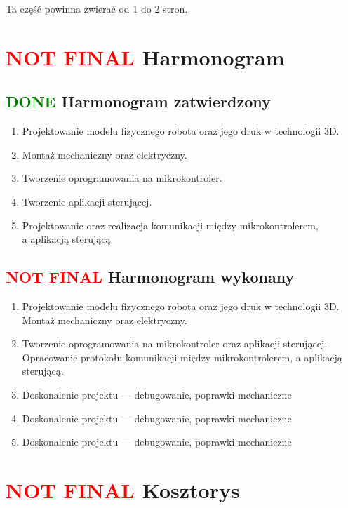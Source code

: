 \documentclass[11pt,titlepage]{article}
\begin{document}
Ta część powinna zwierać od 1 do 2 stron.

\newpage

\section{\textcolor{red}{NOT FINAL} Harmonogram}

\subsection{\textcolor{green}{DONE} Harmonogram zatwierdzony}

\begin{enumerate}
    \item Projektowanie modelu fizycznego robota oraz jego druk w technologii 3D.
    \item Montaż mechaniczny oraz elektryczny.
    \item Tworzenie oprogramowania na mikrokontroler.
    \item Tworzenie aplikacji sterującej.
    \item Projektowanie oraz realizacja komunikacji między mikrokontrolerem, \\a aplikacją sterującą.
\end{enumerate}

\subsection{\textcolor{red}{NOT FINAL} Harmonogram wykonany}

\begin{enumerate}
    \item Projektowanie modelu fizycznego robota oraz jego druk w technologii 3D. Montaż mechaniczny oraz elektryczny.
    \item Tworzenie oprogramowania na mikrokontroler oraz aplikacji sterującej. Opracowanie protokołu komunikacji między mikrokontrolerem, a aplikacją sterującą.
    \item Doskonalenie projektu — debugowanie, poprawki mechaniczne
    \item Doskonalenie projektu — debugowanie, poprawki mechaniczne
    \item Doskonalenie projektu — debugowanie, poprawki mechaniczne
\end{enumerate}

\newpage

\section{\textcolor{red}{NOT FINAL} Kosztorys}
\end{document}
